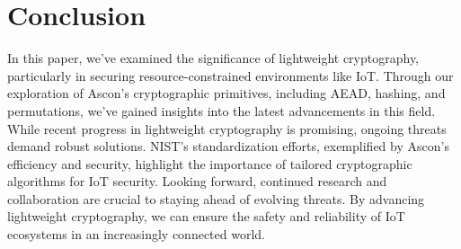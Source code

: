 \section{Conclusion}
In this paper, we've examined the significance of lightweight cryptography, particularly in securing resource-constrained environments like IoT. Through our exploration of Ascon's cryptographic primitives, including AEAD, hashing, and permutations, we've gained insights into the latest advancements in this field.
While recent progress in lightweight cryptography is promising, ongoing threats demand robust solutions. NIST's standardization efforts, exemplified by Ascon's efficiency and security, highlight the importance of tailored cryptographic algorithms for IoT security.
Looking forward, continued research and collaboration are crucial to staying ahead of evolving threats. By advancing lightweight cryptography, we can ensure the safety and reliability of IoT ecosystems in an increasingly connected world.